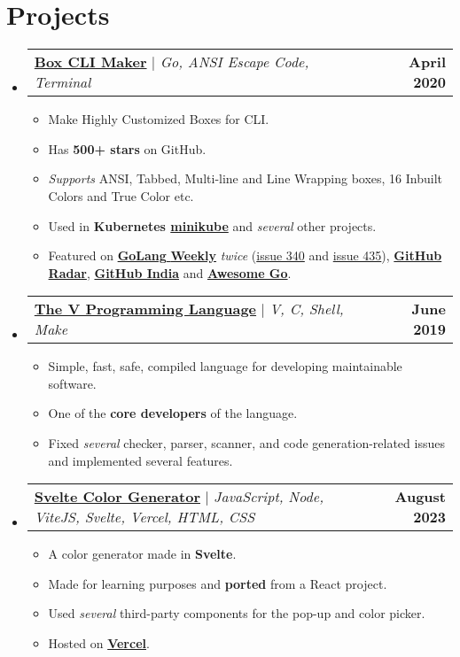 \documentclass[letterpaper,11pt]{article}
\makeatletter
\newcommand{\resumeItem}[1]{
  \item\small{
    {#1 \vspace{-2pt}}
  }
}
\newcommand{\resumeProjectHeading}[2]{
    \item
    \begin{tabular*}{1.001\textwidth}{l@{\extracolsep{\fill}}r}
      \small#1 & \textbf{\small #2}\\
    \end{tabular*}\vspace{-7pt}
}
\newcommand{\resumeSubHeadingListStart}{\begin{itemize}[leftmargin=0.0in, label={}]}
\newcommand{\resumeSubHeadingListEnd}{\end{itemize}}
\newcommand{\resumeItemListStart}{\begin{itemize}}
\newcommand{\resumeItemListEnd}{\end{itemize}\vspace{-5pt}}
\makeatother
\begin{document}
\section{Projects}
    \vspace{-5pt}
    \resumeSubHeadingListStart
      \resumeProjectHeading
          {\textbf{\href{https://github.com/Delta456/box-cli-maker}{Box CLI Maker}} $|$ \emph{Go, ANSI Escape Code, Terminal}}{April 2020}
          \resumeItemListStart
            \resumeItem{Make Highly Customized Boxes for CLI.}
            \resumeItem{Has \textbf{500+ stars} on GitHub.}
            \resumeItem{\textit{Supports} ANSI, Tabbed, Multi-line and Line Wrapping boxes, 16 Inbuilt Colors and True Color etc.}
            \resumeItem{Used in \textbf{Kubernetes \href{https://github.com/kubernetes/minikube}{minikube}} and \textit{several} other projects.}
            \resumeItem{Featured on \href{https://golangweekly.com/}{\textbf{GoLang} \textbf{Weekly}}\textit{ twice} (\href{https://golangweekly.com/issues/340}{issue 340} and \href{https://golangweekly.com/issues/435}{issue 435}), \href{https://github.blog/2022-12-16-release-radar-nov-2022/}{\textbf{GitHub Radar}}, \href{https://githubindia.com/open-source/projects}{\textbf{GitHub India}} and \href{https://awesome-go.com/}{\textbf{Awesome Go}}.}
          \resumeItemListEnd
          \vspace{-13pt}
      \resumeProjectHeading
          {\textbf{\href{https://github.com/vlang/v}{The V Programming Language}} $|$ \emph{V, C, Shell, Make}}{June 2019}
          \resumeItemListStart
            \resumeItem{Simple, fast, safe, compiled language for developing maintainable software.}
            \resumeItem{One of the \textbf{core developers} of the language.}
            \resumeItem{Fixed \textit{several} checker, parser, scanner, and code generation-related issues and implemented several features.}
          \resumeItemListEnd 
          \vspace{-13pt}  
          \resumeProjectHeading{\textbf{\href{https://github.com/Delta456/svelte-color-generator}{Svelte Color Generator}} $|$ \emph{JavaScript, Node, ViteJS, Svelte, Vercel, HTML, CSS}}{August 2023}
          \resumeItemListStart
            \resumeItem{A color generator made in \textbf{Svelte}.}
            \resumeItem{Made for learning purposes and \textbf{ported} from a React project.}
            \resumeItem{Used \textit{several} third-party components for the pop-up and color picker.}
            \resumeItem{Hosted on \href{https://svelte-color-generator-kappa.vercel.app/}{\textbf{Vercel}}.}
          \resumeItemListEnd
    \resumeSubHeadingListEnd
\vspace{-15pt}
\end{document}
